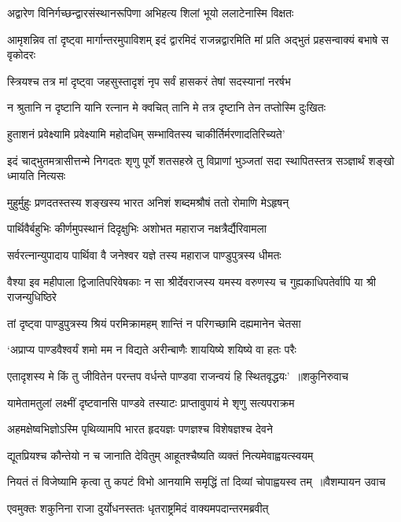 \twolineshloka
{अद्वारेण विनिर्गच्छन्द्वारसंस्थानरूपिणा}
{अभिहत्य शिलां भूयो ललाटेनास्मि विक्षतः}


\threelineshloka
{आमृशन्निव तां दृष्ट्वा मार्गान्तरमुपाविशम्}
{इदं द्वारमिदं राजन्नद्वारमिति मां प्रति}
{अद्भुतं प्रहसन्वाक्यं बभाषे स वृकोदरः}


\twolineshloka
{स्त्रियश्च तत्र मां दृष्ट्वा जहसुस्तादृशं नृप}
{सर्वं हासकरं तेषां सदस्यानां नरर्षभ}


\twolineshloka
{न श्रुतानि न दृष्टानि यानि रत्नान मे क्वचित्}
{तानि मे तत्र दृष्टानि तेन तप्तोस्मि दुःखितः}


\twolineshloka
{हुताशनं प्रवेक्ष्यामि प्रवेक्ष्यामि महोदधिम्}
{सम्भावितस्य चाकीर्तिर्मरणादतिरिच्यते'}


इदं चाद्भुतमत्रासीत्तन्मे निगदतः शृणु
\twolineshloka
{पूर्णे शतसहस्रे तु विप्राणां भुञ्जतां सदा}
{स्थापितस्तत्र सञ्ज्ञार्थं शङ्खो ध्मायति नित्यसः}


\twolineshloka
{मुहुर्मुहुः प्रणदतस्तस्य शङ्खस्य भारत}
{अनिशं शब्दमश्रौषं ततो रोमाणि मेऽहृषन्}


\twolineshloka
{पार्थिवैर्बहुभिः कीर्णमुपस्थानं दिदृक्षुभिः}
{अशोभत महाराज नक्षत्रैर्द्यैरिवामला}


\twolineshloka
{सर्वरत्नान्युपादाय पार्थिवा वै जनेश्वर}
{यज्ञे तस्य महाराज पाण्डुपुत्रस्य धीमतः}


\threelineshloka
{वैश्या इव महीपाला द्विजातिपरिवेषकाः}
{न सा श्रीर्देवराजस्य यमस्य वरुणस्य च}
{गुह्यकाधिपतेर्वापि या श्री राजन्युधिष्ठिरे}


\twolineshloka
{तां दृष्ट्वा पाण्डुपुत्रस्य श्रियं परमिक्रामहम्}
{शान्तिं न परिगच्छामि दह्यमानेन चेतसा}


\twolineshloka
{`अप्राप्य पाण्डवैश्वर्यं शमो मम न विद्यते}
{अरीन्बाणैः शाययिष्ये शयिष्ये वा हतः परैः}


\twolineshloka
{एतादृशस्य मे किं तु जीवितेन परन्तप}
{वर्धन्ते पाण्डवा राजन्वयं हि स्थितवृद्धयः' ॥शकुनिरुवाच}


\twolineshloka
{यामेतामतुलां लक्ष्मीं दृष्टवानसि पाण्डवे}
{तस्याटः प्राप्तावुपायं मे शृणु सत्यपराक्रम}


\twolineshloka
{अहमक्षेष्वभिज्ञोऽस्मि पृथिव्यामपि भारत}
{हृदयज्ञः पणज्ञश्च विशेषज्ञश्च देवने}


\twolineshloka
{द्यूतप्रियश्च कौन्तेयो न च जानाति देवितुम्}
{आहूतश्चैष्यति व्यक्तं नित्यमेवाह्वयत्स्वयम्}


\twolineshloka
{नियतं तं विजेष्यामि कृत्वा तु कपटं विभो}
{आनयामि समृद्धिं तां दिव्यां चोपाह्वयस्व तम् ॥वैशम्पायन उवाच}


\twolineshloka
{एवमुक्तः शकुनिना राजा दुर्योधनस्ततः}
{धृतराष्ट्रमिदं वाक्यमपदान्तरमब्रवीत्}


